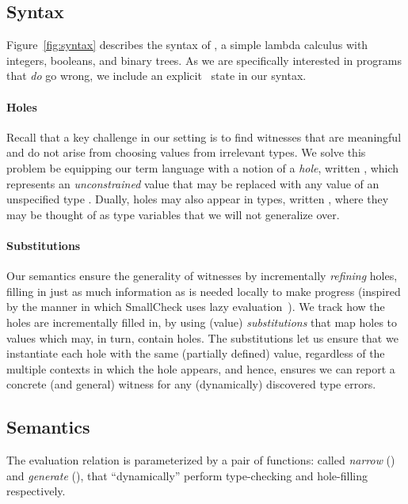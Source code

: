 \subsection{Syntax}
\label{sec:syntax}

%
Figure~\ref{fig:syntax} describes the syntax of \lang, a simple lambda
calculus with integers, booleans, and binary trees.
%
As we are specifically interested in programs that \emph{do} go wrong,
we include an explicit \stuck\ state in our syntax.

\paragraph{Holes}
\label{sec:holes}
%
Recall that a key challenge in our setting is to find witnesses
that are meaningful and do not arise from choosing values from
irrelevant types.
%
We solve this problem be equipping our term language with a notion
of a \emph{hole}, written \vhole{\thole}, which represents an \emph{unconstrained}
value that may be replaced with any value of an unspecified type \thole.
%
Dually, holes may also appear in types, written \thole, where they may
be thought of as type variables that we will not generalize over.
%

\paragraph{Substitutions}
%
Our semantics ensure the generality of witnesses by incrementally
\emph{refining} holes, filling in just as much information as is
needed locally to make progress (inspired by the manner in
which SmallCheck uses lazy evaluation~\cite{runciman_smallcheck_2008}).
%
We track how the holes are incrementally filled in, by using
(value) \emph{substitutions} that map holes %
to values which may, in turn, contain holes.
%
The substitutions let us ensure that we instantiate each hole
with the same (partially defined) value, regardless of the multiple
contexts in which the hole appears, and hence, ensures we can
report a concrete (and general) witness for any (dynamically)
discovered type errors.

\subsection{Semantics}
\label{sec:semantics}
%

The evaluation relation is parameterized by a pair of functions:
called \emph{narrow} (\forcesym) and \emph{generate} (\gensym),
that ``dynamically'' perform type-checking and hole-filling
respectively.

